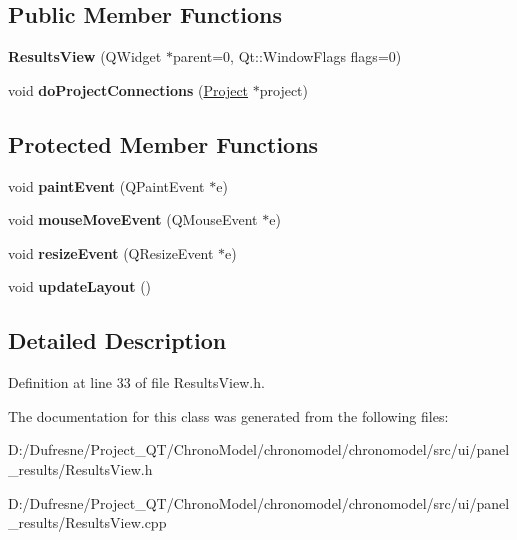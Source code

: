 \subsection*{Public Member Functions}
\begin{DoxyCompactItemize}
\item 
\hypertarget{class_results_view_a9afab8613f72355bc97f762e7789c84a}{{\bfseries Results\-View} (Q\-Widget $\ast$parent=0, Qt\-::\-Window\-Flags flags=0)}\label{class_results_view_a9afab8613f72355bc97f762e7789c84a}

\item 
\hypertarget{class_results_view_af249eb122ffa0a109477def6036d580e}{void {\bfseries do\-Project\-Connections} (\hyperlink{class_project}{Project} $\ast$project)}\label{class_results_view_af249eb122ffa0a109477def6036d580e}

\end{DoxyCompactItemize}
\subsection*{Protected Member Functions}
\begin{DoxyCompactItemize}
\item 
\hypertarget{class_results_view_ad984c9c1bb6ce0bd6fdad15120fd5d99}{void {\bfseries paint\-Event} (Q\-Paint\-Event $\ast$e)}\label{class_results_view_ad984c9c1bb6ce0bd6fdad15120fd5d99}

\item 
\hypertarget{class_results_view_a14e4b9d1f113bb61f7f2c79f82447ecc}{void {\bfseries mouse\-Move\-Event} (Q\-Mouse\-Event $\ast$e)}\label{class_results_view_a14e4b9d1f113bb61f7f2c79f82447ecc}

\item 
\hypertarget{class_results_view_af785d2ff31bc7f6617276a2f16e0ed3d}{void {\bfseries resize\-Event} (Q\-Resize\-Event $\ast$e)}\label{class_results_view_af785d2ff31bc7f6617276a2f16e0ed3d}

\item 
\hypertarget{class_results_view_a1f04d67f06dbd52e0fb586e0281523a9}{void {\bfseries update\-Layout} ()}\label{class_results_view_a1f04d67f06dbd52e0fb586e0281523a9}

\end{DoxyCompactItemize}


\subsection{Detailed Description}


Definition at line 33 of file Results\-View.\-h.



The documentation for this class was generated from the following files\-:\begin{DoxyCompactItemize}
\item 
D\-:/\-Dufresne/\-Project\-\_\-\-Q\-T/\-Chrono\-Model/chronomodel/chronomodel/src/ui/panel\-\_\-results/Results\-View.\-h\item 
D\-:/\-Dufresne/\-Project\-\_\-\-Q\-T/\-Chrono\-Model/chronomodel/chronomodel/src/ui/panel\-\_\-results/Results\-View.\-cpp\end{DoxyCompactItemize}
